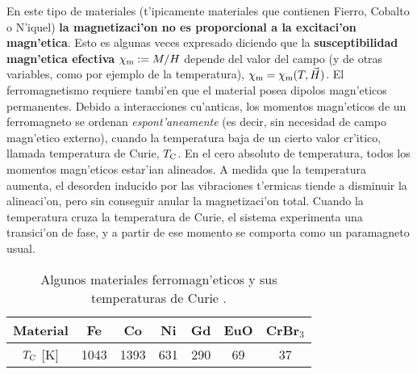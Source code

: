  En este tipo de materiales (t'ipicamente materiales que
contienen Fierro, Cobalto o N'iquel) \textbf{la magnetizaci'on no es
proporcional a la excitaci'on magn'etica}. Esto es algunas veces expresado
diciendo que la \textbf{susceptibilidad magn'etica efectiva} $\chi_{\rm m}:=M/H$ depende del valor del campo (y de otras variables, como por ejemplo de la temperatura), $\chi_{\rm m}=\chi_{\rm m}(T,\vec{H})$. El ferromagnetismo
requiere tambi'en que el material posea dipolos magn'eticos permanentes. Debido
a interacciones cu'anticas, los momentos magn'eticos de un ferromagneto se
ordenan \textit{espont'aneamente} (es decir, sin necesidad de campo magn'etico
externo), cuando la temperatura baja de un cierto valor cr'itico, llamada
temperatura de Curie, $T_{\rm C}$. En el cero absoluto de temperatura, todos los
momentos magn'eticos estar'ian alineados. A medida que la temperatura aumenta, el
desorden inducido por las vibraciones t'ermicas tiende a disminuir la
alineaci'on, pero sin conseguir
anular la magnetizaci'on total. Cuando la temperatura cruza la temperatura de
Curie, el sistema experimenta una transici'on de fase, y a partir de ese
momento se comporta como un paramagneto usual.
\begin{table}[h!]
\begin{center}
\begin{tabular}{c||c|c|c|c|c|c}
Material & Fe & Co & Ni & Gd & EuO & CrBr${}_3$  \\ \hline
$T_{\rm C}$ [K] & 1043 & 1393 & 631 & 290 & 69 & 37
\end{tabular}
\caption{Algunos materiales ferromagn'eticos y sus temperaturas de Curie 
\cite{Nolting}.}
\end{center}
\end{table}

